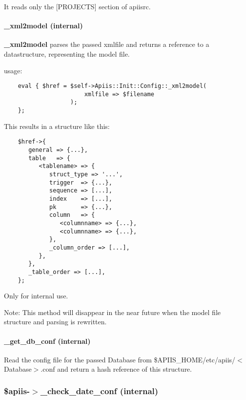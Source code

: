 It reads only the [PROJECTS] section of apiisrc.

\paragraph*{\_xml2model (internal)\label{Apiis::Init::Config_mainly_ready_apiisrc_config_files__xml2model_internal_}}


\textbf{\_xml2model} parses the passed xmlfile and returns a reference to a
datastructure, representing the model file.



usage:

\begin{verbatim}
    eval { $href = $self->Apiis::Init::Config::_xml2model(
                       xmlfile => $filename
                   );
    };
\end{verbatim}


This results in a structure like this:

\begin{verbatim}
    $href->{
       general => {...},
       table   => {
          <tablename> => {
             struct_type => '...',
             trigger  => {...},
             sequence => [...],
             index    => [...],
             pk       => {...},
             column   => {
                <columnname> => {...},
                <columnname> => {...},
             },
             _column_order => [...],
          },
       },
       _table_order => [...],
    };
\end{verbatim}


Only for internal use.



Note: This method will disappear in the near future when the model file
structure and parsing is rewritten.

\paragraph*{\_get\_db\_conf (internal)\label{Apiis::Init::Config_mainly_ready_apiisrc_config_files__get_db_conf_internal_}}


Read the config file for the passed Database from
\$APIIS\_HOME/etc/apiis/$<$Database$>$.conf and return a hash reference of this
structure.

\subsubsection*{\$apiis-$>$\_check\_date\_conf (internal)\label{_apiis-_check_date_conf_internal_}}


